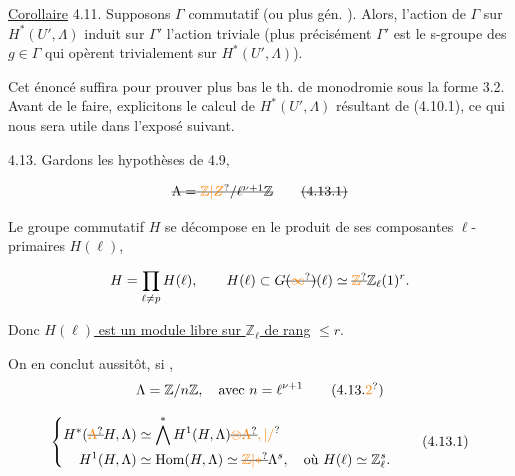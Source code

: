 \uline{Corollaire} 4.11.   Supposons $\Gamma$ commutatif (ou plus gén. ). Alors, l'action de $\Gamma$ sur $H^*(U',\Lambda)$ induit sur $\Gamma'$ l'action triviale (plus précisément $\Gamma'$ est le s-groupe des $g\in\Gamma$ qui opèrent trivialement sur $H^*(U',\Lambda)$).

Cet énoncé suffira  pour prouver   plus bas le th. de monodromie sous la forme 3.2. Avant de le faire, explicitons le calcul de $H^*(U',\Lambda)$ résultant de (4.10.1), ce qui nous sera utile dans l'exposé suivant.


4.13. Gardons les hypothèses de 4.9, 

\[
\deleted{\Lambda=\unsure{\mathbb{Z}|Z}/\ell^{\nu+1}\mathbb{Z}}
\tag*{\deleted{(4.13.1)}}
\]

Le groupe commutatif $H$ se décompose en le produit de ses composantes $\ell$-primaires $H(\ell)$,

\[
H=\prod_{\ell\ne p}H(\ell),\qquad H(\ell)\subset G\deleted{(\unsure{\infty})}(\ell)\simeq\deleted{\unsure{\mathbb{Z}}}\mathbb{Z}_\ell(1)^r.
\]

Donc \uline{$H(\ell)$ est un module libre sur $\mathbb{Z}_\ell$ de rang} $\leq r$.

On en conclut  aussitôt, si ,  
\[
\Lambda=\mathbb{Z}/n\mathbb{Z},\quad\text{avec }n=\ell^{\nu+1}
\tag*{(4.13.\unsure{2})}
\]

\[
\left\{\begin{aligned}
H^*(\deleted{\unsure{\Lambda}}H,\Lambda)&\simeq\bigwedge^*H^1(H,\Lambda)\deleted{\unsure{\otimes\Lambda}}\unsure{,|/}\\
H^1(H,\Lambda)&\simeq\operatorname{Hom}(H,\Lambda)\simeq\deleted{\unsure{\mathbb{Z}|*}}\Lambda^s,\quad\text{où }H(\ell)\simeq\mathbb{Z}_\ell^s.
\end{aligned}\right.
\tag*{(4.13.1)}
\]

